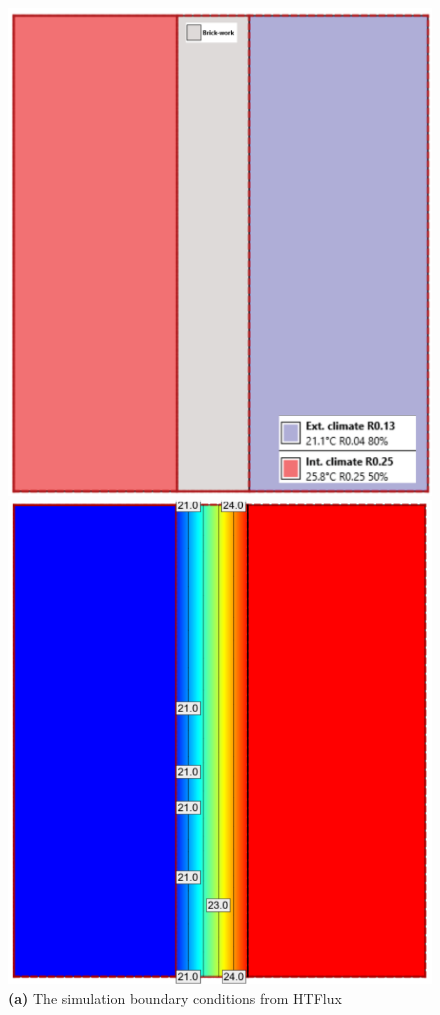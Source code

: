 \begin{figure}[tbh]
\begin{minipage}{0.45\textwidth}
  \centering
  \includegraphics[width=\linewidth]{Figures/2dconst.png} 
  \caption*{\textbf{(a)} The simulation boundary conditions from HTFlux}
\end{minipage}%
\hspace{0.1\textwidth}
\begin{minipage}{0.45\textwidth}
  \centering
  \includegraphics[width=\linewidth]{Figures/2dsim.png} 

\end{minipage}
\end{figure}
